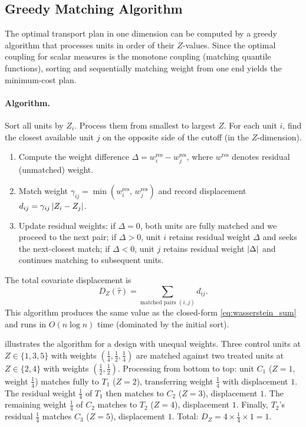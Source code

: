 \subsection{Greedy Matching Algorithm}\label{sec:appendix:zdisplacement:algorithm}

The optimal transport plan in one dimension can be computed by a greedy algorithm that processes units in order of their $Z$-values.
Since the optimal coupling for scalar measures is the monotone coupling (matching quantile functions), sorting and sequentially matching weight from one end yields the minimum-cost plan.

\paragraph{Algorithm.}
Sort all units by $Z_i$.
Process them from smallest to largest $Z$.
For each unit $i$, find the closest available unit $j$ on the opposite side of the cutoff (in the $Z$-dimension).
\begin{enumerate}
	\item Compute the weight difference $\Delta = w_i^{\mathrm{res}} - w_j^{\mathrm{res}}$, where $w^{\mathrm{res}}$ denotes residual (unmatched) weight.
	\item Match weight $\gamma_{ij} = \min(w_i^{\mathrm{res}},\, w_j^{\mathrm{res}})$ and record displacement $d_{ij} = \gamma_{ij}\, \lvert Z_i - Z_j\rvert$.
	\item Update residual weights: if $\Delta = 0$, both units are fully matched and we proceed to the next pair; if $\Delta > 0$, unit $i$ retains residual weight $\Delta$ and seeks the next-closest match; if $\Delta < 0$, unit $j$ retains residual weight $\lvert\Delta\rvert$ and continues matching to subsequent units.
\end{enumerate}
The total covariate displacement is
\begin{equation}\label{eq:greedy_displacement}
	D_Z(\hat{\tau}) = \sum_{\text{matched pairs } (i,j)} d_{ij}.
\end{equation}
This algorithm produces the same value as the closed-form \eqref{eq:wasserstein_sum} and runs in $O(n \log n)$ time (dominated by the initial sort).

 illustrates the algorithm for a design with unequal weights.
Three control units at $Z \in \{1, 3, 5\}$ with weights $(\tfrac{1}{4}, \tfrac{1}{2}, \tfrac{1}{4})$ are matched against two treated units at $Z \in \{2, 4\}$ with weights $(\tfrac{1}{2}, \tfrac{1}{2})$.
Processing from bottom to top: unit $C_1$ ($Z=1$, weight $\tfrac{1}{4}$) matches fully to $T_1$ ($Z=2$), transferring weight $\tfrac{1}{4}$ with displacement $1$.
The residual weight $\tfrac{1}{4}$ of $T_1$ then matches to $C_2$ ($Z=3$), displacement $1$.
The remaining weight $\tfrac{1}{4}$ of $C_2$ matches to $T_2$ ($Z=4$), displacement $1$.
Finally, $T_2$'s residual $\tfrac{1}{4}$ matches $C_3$ ($Z=5$), displacement $1$.
Total: $D_Z = 4 \times \tfrac{1}{4} \times 1 = 1$.

